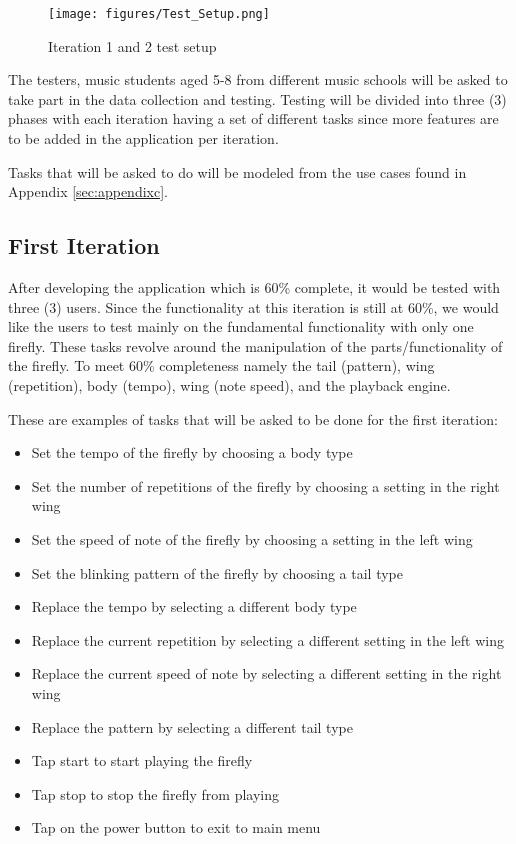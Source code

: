\begin{figure}[H]
    \centering
    \texttt{[image: figures/Test\_Setup.png]}
    \caption{Iteration 1 and 2 test setup}
    \label{test1and2}
\end{figure}

The testers, music students aged 5-8 from different music schools will be asked to take part in the data collection and testing. Testing will be divided into three (3) phases with each iteration having a set of different tasks since more features are to be added in the application per iteration. 

Tasks that will be asked to do will be modeled from the use cases found in Appendix \ref{sec:appendixc}.

\subsection{First Iteration}
After developing the application which is 60\% complete, it would be tested with three (3) users. Since the functionality at this iteration is still at 60\%, we would like the users to test mainly on the fundamental functionality with only one firefly. These tasks revolve around the manipulation of the parts/functionality of the firefly. To meet 60\% completeness namely the tail (pattern), wing (repetition), body (tempo), wing (note speed), and the playback engine. 

These are examples of tasks that will be asked to be done for the first iteration:
\begin{itemize}
    \item Set the tempo of the firefly by choosing a body type
    \item Set the number of repetitions of the firefly by choosing a setting in the right wing
    \item Set the speed of note of the firefly by choosing a setting in the left wing
    \item Set the blinking pattern of the firefly by choosing a tail type
    \item Replace the tempo by selecting a different body type
    \item Replace the current repetition by selecting a different setting in the left wing
    \item Replace the current speed of note by selecting a different setting in the right wing
    \item Replace the pattern by selecting a different tail type
    \item Tap start to start playing the firefly
    \item Tap stop to stop the firefly from playing
    \item Tap on the power button to exit to main menu
\end{itemize}

